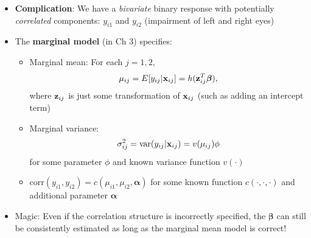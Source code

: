 \documentclass{beamer}
\newcommand{\boldbeta}{{\boldsymbol \beta}}
\newenvironment{wideitemize}%
  {\begin{itemize}%
    \setlength{\parskip}{1em}}%
  {\end{itemize}}
\begin{document}
\begin{frame}
\begin{itemize}
\item
\textbf{Complication}: We have a \emph{bivariate} binary response with potentially \emph{correlated} components: $y_{i1}$ and $y_{i2}$ (impairment of left and right eyes)
\item The \textbf{marginal model} (in Ch 3) specifies:
\ \

\begin{wideitemize}
\item Marginal mean:  For each $j = 1, 2$, 
\[
\mu_{ij} = E[y_{ij}|{\bf x}_{ij}] = h({\bf z}^T_{ij} \boldbeta),
\] where ${\bf z}_{ij}$ is just some transformation of ${\bf x}_{ij}$ (such as adding an intercept term)
\item Marginal variance: 
\[
\sigma_{ij}^2=\mbox{var}(y_{ij}|{\bf x}_{ij})=v(\mu_{ij})\phi
\]
 for some parameter $\phi$ and known variance function $v(\cdot)$
\item $\text{corr}(y_{i1}, y_{i2})=c(\mu_{i1}, \mu_{i2}, {\boldsymbol \alpha})$ for some known function $c(\cdot, \cdot, \cdot)$ and additional parameter $\boldsymbol \alpha$
\end{wideitemize}


\item Magic: Even if the correlation structure is incorrectly specified, the $\boldbeta$  can still be consistently estimated as long as the marginal mean model is correct!

\end{itemize}
\end{frame}
\end{document}
